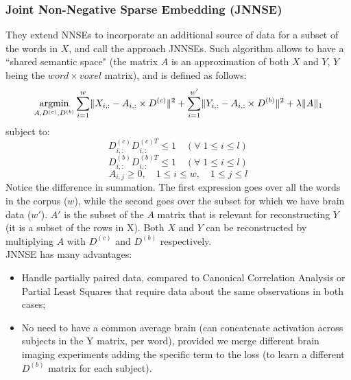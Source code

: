 \subsubsection{Joint Non-Negative Sparse Embedding (JNNSE)}
They extend NNSEs to incorporate an additional source of data for a subset of the words in $X$, and call the approach JNNSEs.
Such algorithm allows to have a ``shared semantic space" (the matrix $A$ is an approximation of both $X$ and $Y$, $Y$ being the $word \times voxel$ matrix), and is defined as follows:
\[
\operatorname*{argmin}_{A,D^{(c)},D^{(b)}} \sum_{i=1}^w \lVert X_{i,:} - A_{i,:} \times D^{(c)} \rVert^2 +  \sum_{i=1}^{w'} \lVert Y_{i,:} - A_{i,:} \times D^{(b)} \rVert^2 + \lambda \lVert A\rVert_1
\]
subject to:
\[
D_{i,:}^{(c)}D_{i,:}^{(c)T} \leq 1 \quad(\forall \;1 \leq i \leq l)
\]
\[
D_{i,:}^{(b)}D_{i,:}^{(b)T} \leq 1 \quad(\forall \;1 \leq i \leq l)
\]
\[
A_{i,j} \geq 0,\quad 1 \leq i \leq w,\quad 1 \leq j \leq l
\]
Notice the difference in summation. The first expression goes over all the words in the corpus ($w$), while the second goes over the subset for which we have brain data ($w'$).
$A'$ is the subset of the $A$ matrix that is relevant for reconstructing $Y$ (it is a subset of the rows in X).
Both $X$ and $Y$ can be reconstructed by multiplying $A$ with $D^{(c)}$ and $D^{(b)}$ respectively.\\

JNNSE has many advantages:
\begin{itemize}
    \item Handle partially paired data, compared to Canonical Correlation Analysis or Partial Least Squares that require data about the same observations in both cases;
    \item No need to have a common average brain (can concatenate activation across subjects in the Y matrix, per word), provided we merge different brain imaging experiments adding the specific term to the loss (to learn a different $D^{(b)}$ matrix for each subject).
\end{itemize}

